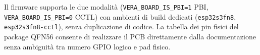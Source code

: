 \documentclass[12pt, a4paper]{article}
\begin{document}
\begin{sloppypar}
Il firmware supporta le due modalità (\texttt{VERA\_BOARD\_IS\_PBI=1} PBI,
\texttt{VERA\_BOARD\_IS\_PBI=0} CCTL) con ambienti di build dedicati
(\texttt{esp32s3fn8}, \texttt{esp32s3fn8-cctl}), senza duplicazione di codice. La tabella dei pin fisici
del package QFN56 consente di realizzare il PCB direttamente dalla documentazione
senza ambiguità tra numero GPIO logico e pad fisico.
\end{sloppypar}
\end{document}
